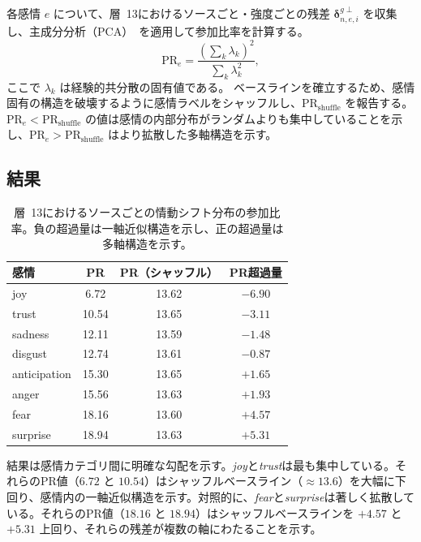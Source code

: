 各感情 $e$ について、層~13におけるソースごと・強度ごとの残差 $\boldsymbol{\delta}^{g\perp}_{n,e,i}$ を収集し、主成分分析（PCA）~\cite{pearson1901pca}を適用して参加比率を計算する。
\[
\mathrm{PR}_e
=\frac{\left(\sum_k \lambda_k\right)^2}{\sum_k \lambda_k^2},
\]
ここで $\lambda_k$ は経験的共分散の固有値である。
ベースラインを確立するため、感情固有の構造を破壊するように感情ラベルをシャッフルし、$\mathrm{PR}_{\mathrm{shuffle}}$ を報告する。$\mathrm{PR}_e < \mathrm{PR}_{\mathrm{shuffle}}$ の値は感情の内部分布がランダムよりも集中していることを示し、$\mathrm{PR}_e > \mathrm{PR}_{\mathrm{shuffle}}$ はより拡散した多軸構造を示す。\par

\subsection*{結果}

\begin{table}[H]
\centering
\small
\begin{tabular}{lccc}
\toprule
\textbf{感情} & \textbf{PR} & \textbf{PR（シャッフル）} & \textbf{PR超過量} \\
\midrule
joy        &  6.72 & 13.62 & $-6.90$ \\
trust      & 10.54 & 13.65 & $-3.11$ \\
sadness    & 12.11 & 13.59 & $-1.48$ \\
disgust    & 12.74 & 13.61 & $-0.87$ \\
anticipation & 15.30 & 13.65 & $+1.65$ \\
anger      & 15.56 & 13.63 & $+1.93$ \\
fear       & 18.16 & 13.60 & $+4.57$ \\
surprise   & 18.94 & 13.63 & $+5.31$ \\
\bottomrule
\end{tabular}
\caption{層~13におけるソースごとの情動シフト分布の参加比率。負の超過量は一軸近似構造を示し、正の超過量は多軸構造を示す。}
\label{tab:exp2_participation_ratio}
\end{table}

結果は感情カテゴリ間に明確な勾配を示す。\textit{joy}と\textit{trust}は最も集中している。それらのPR値（$6.72$ と $10.54$）はシャッフルベースライン（$\approx 13.6$）を大幅に下回り、感情内の一軸近似構造を示す。対照的に、\textit{fear}と\textit{surprise}は著しく拡散している。それらのPR値（$18.16$ と $18.94$）はシャッフルベースラインを $+4.57$ と $+5.31$ 上回り、それらの残差が複数の軸にわたることを示す。\par

